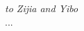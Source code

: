 \vspace*{\fill}
\noindent
\begin{minipage}{1\textwidth}
\begin{center}
{\textit{to Zijia and Yibo }\\...}
\end{center}
\end{minipage}
\vfill